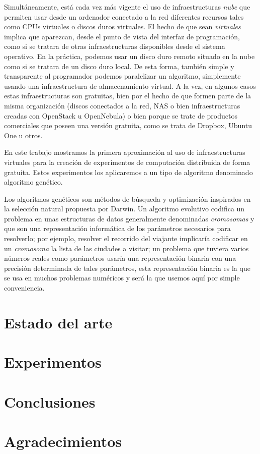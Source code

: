\documentclass{article}
\begin{document}
Simultáneamente, está cada vez más vigente el uso de infraestructuras
{\em nube} que permiten usar desde un ordenador conectado a la red
diferentes recursos tales como CPUs virtuales o discos duros
virtuales. El hecho de que sean {\em virtuales} implica que aparezcan,
desde el punto de vista del interfaz de programación, como si se
tratara de otras infraestructuras disponibles desde el sistema
operativo. En la práctica, podemos usar un disco duro remoto situado
en la nube como si se tratara de un disco duro local. De esta forma,
también simple y transparente al programador podemos paralelizar un
algoritmo, simplemente usando una infraestructura de almacenamiento
virtual. A la vez, en algunos casos estas infraestructuras son
gratuitas, bien por el hecho de que formen parte de la misma
organización (discos conectados a la red, NAS o bien infraestructuras
creadas con OpenStack u OpenNebula) o bien porque se trate de
productos comerciales que poseen una versión gratuita, como se trata
de Dropbox, Ubuntu One u otros. 

En este trabajo mostramos la primera aproximación al uso de
infraestructuras virtuales para la creación de experimentos de
computación distribuida de forma gratuita. Estos experimentos los
aplicaremos a un tipo de algoritmo denominado algoritmo genético. 

Los algoritmos genéticos \cite{guervos2010informatica} son métodos de búsqueda y optimización
inspirados en la selección natural propuesta por
Darwin. Un algoritmo evolutivo codifica un problema en unas
estructuras de datos generalmente denominadas {\em cromosomas} y que
son una representación informática de los parámetros necesarios para
resolverlo; por ejemplo, resolver el recorrido del viajante implicaría
codificar en un {\em cromosoma} la lista de las ciudades a visitar; un
problema que tuviera varios números reales como parámetros usaría una
representación binaria con una precisión determinada de tales
parámetros, esta representación binaria es la que se usa en muchos
problemas numéricos y será la que usemos aquí por simple
conveniencia. 


\section{Estado del arte}

\section{Experimentos}

\section{Conclusiones}

\section{Agradecimientos}

\nocite{*}


\end{document}
